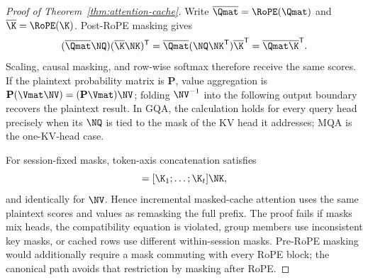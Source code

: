 \begin{proof}[Proof of Theorem~\ref{thm:attention-cache}]
Write $\overline{\Qmat}=\RoPE(\Qmat)$ and
$\overline{\K}=\RoPE(\K)$.  Post-RoPE masking gives
\begin{equation}
(\overline{\Qmat}\NQ)(\overline{\K}\NK)^{\mathsf T}
=\overline{\Qmat}(\NQ\NK^{\mathsf T})\overline{\K}^{\mathsf T}
=\overline{\Qmat}\overline{\K}^{\mathsf T}.
\end{equation}
Scaling, causal masking, and row-wise softmax therefore receive the same
scores.  If the plaintext probability matrix is $\mathbf P$, value aggregation
is $\mathbf P(\Vmat\NV)=(\mathbf P\Vmat)\NV$; folding $\NV^{-1}$ into the following
output boundary recovers the plaintext result.  In GQA, the calculation holds
for every query head precisely when its $\NQ$ is tied to the mask of the KV
head it addresses; MQA is the one-KV-head case.

For session-fixed masks, token-axis concatenation satisfies
\begin{equation}
[\K_1\NK;\ldots;\K_t\NK]=[\K_1;\ldots;\K_t]\NK,
\end{equation}
and identically for $\NV$.  Hence incremental masked-cache attention uses the
same plaintext scores and values as remasking the full prefix.  The proof fails
if masks mix heads, the compatibility equation is violated, group members use
inconsistent key masks, or cached rows use different within-session masks.
Pre-RoPE masking would additionally require a mask commuting with every RoPE
block; the canonical path avoids that restriction by masking after RoPE.
\end{proof}


